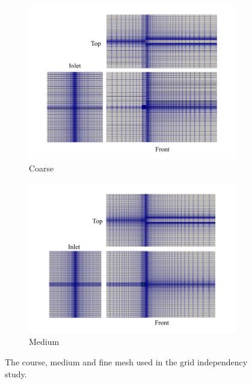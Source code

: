 \documentclass[oneside]{utmthesis}
\begin{document}
\begin{figure}
  \centering
  \begin{subfigure}[h]{0.85\textwidth}
    \includegraphics[width=\textwidth]{figs/figure6a}
    \caption{Coarse}
    \label{fig:coarseMesh}
  \end{subfigure}

  \begin{subfigure}[h]{0.85\textwidth}
    \includegraphics[width=\textwidth]{figs/figure6b}
    \caption{Medium}
    \label{fig:mediumMesh}
  \end{subfigure}

  \caption{The course, medium and fine mesh used in the grid independency study.}
\end{figure}
\end{document}
